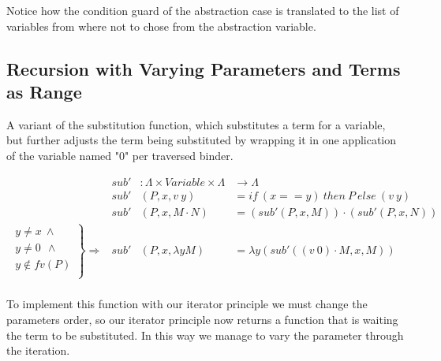 \documentclass{entcs}
\begin{document}
Notice how the condition guard of the abstraction case is translated to the list of variables from where not to chose from the abstraction variable.

 \hspace{5px}

\subsection{Recursion with Varying Parameters and Terms as Range}

A variant of the substitution function, which substitutes a term for a variable, but further adjusts the term being substituted by wrapping it in one application of the variable named "0" per traversed binder.

\[
\begin{array}{rrll}
&sub' &: \Lambda \times Variable \times  \Lambda &   \rightarrow  \Lambda  \\
&sub' &(P , x , v\ y)         &= if\ (x == y)\ then\ P\ else\ (v\ y)   \\
&sub' &(P , x , M \cdot N)    &= (sub' (P , x , M)) \cdot (sub' (P , x , N)) \\
\left. 
\begin{array}{c}
y \neq x  \ \wedge \\
 y \neq 0\ \  \wedge \\
 y \not\in fv(P) \\
\end{array} \right\} \Rightarrow&sub' &(P , x , \lambda y M)   &= \lambda y (sub' ((v\ 0) \cdot M , x , M)) \\
\end{array} \]

To implement this function with our iterator principle we must change the parameters order, so our iterator principle now returns a function that is waiting the term to be substituted. In this way we manage to vary the parameter through the iteration.

 \hspace{5px}


\end{document}
